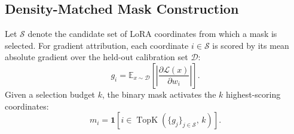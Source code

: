 
\subsection{Density-Matched Mask Construction}
\label{sec:mask}

Let $\mathcal{S}$ denote the candidate set of LoRA coordinates from which
a mask is selected. For gradient attribution, each coordinate
$i \in \mathcal{S}$ is scored by its mean absolute gradient over the
held-out calibration set $\mathcal{D}$:
\begin{equation}
\label{eq:grad_score}
g_i
=
\mathbb{E}_{x \sim \mathcal{D}}
\left[
\left|
\frac{\partial \mathcal{L}(x)}{\partial w_i}
\right|
\right].
\end{equation}
Given a selection budget $k$, the binary mask activates the $k$
highest-scoring coordinates:
\begin{equation}
\label{eq:topk}
m_i
=
\mathbf{1}
\left[
i \in
\operatorname{TopK}
\left(
\{g_j\}_{j\in\mathcal{S}},\, k
\right)
\right].
\end{equation}

